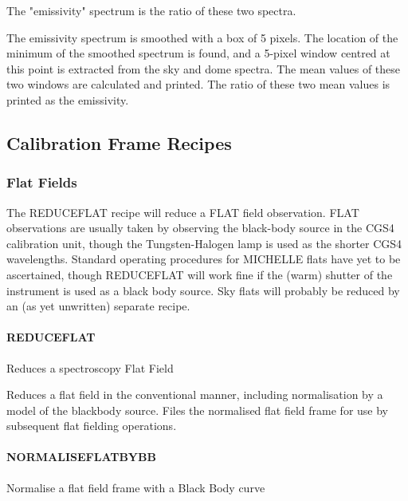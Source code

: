 \documentclass[twoside,11pt]{article}
\renewcommand{\_}{\texttt{\symbol{95}}}
\begin{document}
The "emissivity" spectrum is the ratio of these two spectra.



The emissivity spectrum is smoothed with a box of 5 pixels.  The
location of the minimum of the smoothed spectrum is found, and a
5-pixel window centred at this point is extracted from the sky and
dome spectra.  The mean values of these two windows are calculated and
printed.  The ratio of these two mean values is printed as the
emissivity.


\subsection{Calibration Frame Recipes}

\subsubsection{Flat Fields}

The REDUCE\_FLAT recipe will reduce a FLAT field observation. FLAT
observations are usually taken by observing the black-body source in
the CGS4 calibration unit, though the Tungsten-Halogen lamp is used as
the shorter CGS4 wavelengths. Standard operating procedures for
MICHELLE flats have yet to be ascertained, though REDUCE\_FLAT will
work fine if the (warm) shutter of the instrument is used as a black
body source. Sky flats will probably be reduced by an (as yet
unwritten) separate recipe.

\paragraph{REDUCE\_FLAT\label{REDUCE_FLAT}}


Reduces a spectroscopy Flat Field


\mbox{}


Reduces a flat field in the conventional manner, including
normalisation by a model of the blackbody source. Files the normalised
flat field frame for use by subsequent flat fielding operations.


\paragraph{\_NORMALISE\_FLAT\_BY\_BB\_\label{_NORMALISE_FLAT_BY_BB_}}


Normalise a flat field frame with a Black Body curve
\end{document}

